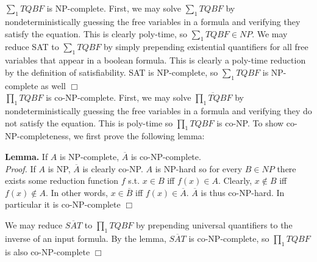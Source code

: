 \documentclass{article}
\newenvironment{myindentpar}[1]
  {\begin{list}{}
          {\setlength{\leftmargin}{#1}
          \setlength{\rightmargin}{#1}}
          \item[]
  }
  {\end{list}}
\begin{document}
\section{}
$\sum_1 TQBF$ is NP-complete. First, we may solve $\sum_1 TQBF$ by nondeterministically guessing the free variables in a formula and verifying they satisfy the equation. This is clearly poly-time, so $\sum_1 TQBF \in NP$. We may reduce SAT to $\sum_1 TQBF$ by simply prepending existential quantifiers for all free variables that appear in a boolean formula. This is clearly a poly-time reduction by the definition of satisfiability. SAT is NP-complete, so $\sum_1 TQBF$ is NP-complete as well $\Box$\\
$\prod_1 TQBF$ is co-NP-complete. First, we may solve $\overline{\prod_1 TQBF}$ by nondeterministically guessing the free variables in a formula and verifying they do not satisfy the equation. This is poly-time so $\prod_1 TQBF$ is co-NP.
To show co-NP-completeness, we first prove the following lemma:
\begin{myindentpar}{1em}
\textbf{Lemma.} If $A$ is NP-complete, $\overline{A}$ is co-NP-complete.\\
\textit{Proof.} If $A$ is NP, $\overline{A}$ is clearly co-NP. $A$ is NP-hard so for every $B \in NP$ there exists some reduction function $f$ s.t. $x \in B$ iff $f(x) \in A$. Clearly, $x \notin B$ iff $f(x) \notin A$. In other words, $x \in \overline{B}$ iff $f(x) \in \overline{A}$. $\overline{A}$ is thus co-NP-hard. In particular it is co-NP-complete $\Box$ 
\end{myindentpar}
We may reduce $\overline{SAT}$ to $\prod_1 TQBF$ by prepending universal quantifiers to the inverse of an input formula. By the lemma, $\overline{SAT}$ is co-NP-complete, so $\prod_1 TQBF$ is also co-NP-complete $\Box$
\end{document}

